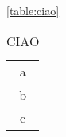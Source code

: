 \autoref{table:ciao}

\begin{table}\begin{tabular}{c}
a\\b\\c\\
\end{tabular}
\caption{CIAO}
\label{table:ciao}
\end{table}
